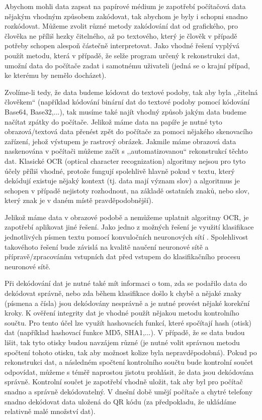 \documentclass[conference]{IEEEtran}
\begin{document}
Abychom mohli data zapsat na papírové médium je zapotřebí počítačová data nějakým vhodným způsobem zakódovat, tak abychom je byly i schopni snadno rozkódovat. Můžeme zvolit různé metody zakódování dat od grafického, pro člověka ne příliš hezky čitelného, až po textového, který je člověk v případě potřeby schopen alespoň částečně interpretovat. Jako vhodné řešení vyplývá použít metodu, která v případě, že selže program určený k rekonstrukci dat, umožní data do počítače zadat i samotnému uživateli (jedná se o krajní případ, ke kterému by nemělo docházet). 

Zvolíme-li tedy, že data budeme kódovat do textové podoby, tak aby byla ,,čitelná člověkem`` (například kódování binární dat do textové podoby pomocí kódování Base64, Base32,...), tak musíme také najít vhodný způsob jakým data budeme načítat zpátky do počítače. Jelikož máme data na papíře je nutné tyto obrazová/textová data přenést zpět do počítače za pomoci nějakého skenovacího zařízení, jehož výstupem je rastrový obrázek. Jakmile máme obrazová data naskenována v počítači můžeme začít s ,,automatizovanou`` rekonstrukcí těchto dat. Klasické OCR (optical character recognization) algoritmy nejsou pro tyto účely příliš vhodné, protože fungují spolehlivě hlavně pokud v textu, který dekódují existuje nějaký kontext (tj. data mají význam slov) a algoritmus je schopen v případě nejistoty rozhodnout, na základě ostatních znaků, nebo slov, který znak je v daném místě pravděpodobnější).

Jelikož máme data v obrazové podobě a nemůžeme uplatnit algoritmy OCR, je zapotřebí aplikovat jiné řešení. Jako jedno z možných řešení je využití klasifikace jednotlivých písmen textu pomocí konvuločních neuronových sítí \cite{NIPS2010_4136}. Spolehlivost takovéhoto řešení bude závislá na kvalitě naučení neuronové sítě a přípravě/zpracováním vstupních dat před vstupem do klasifikačního procesu neuronové sítě.

Při dekódování dat je nutné také mít informaci o tom, zda se podařilo data do dekódovat správně, nebo zda během klasifikace došlo k chybě a nějaké znaky (písmena a čísla) jsou dekódovány nesprávně a je nutné provést nějaké korekční kroky. K ověření integrity dat je vhodné použít nějakou metodu kontrolního součtu. Pro tento účel lze využít hashovacích funkcí, které spočítají hash (otisk) dat (například hashovací funkce MD5, SHA1,...). V případě, že se data budou lišit, tak tyto otisky budou navzájem různé (je nutné volit správnou metodu spočtení tohoto otisku, tak aby možnost kolize byla nepravděpodobná). Pokud po rekonstrukci dat, a následném spočtení kontrolního součtu bude kontrolní součet odpovídat, můžeme s téměř naprostou jistotu prohlásit, že data jsou dekódována správně. Kontrolní součet je zapotřebí vhodně uložit, tak aby byl pro počítač snadno a správně dekódovatelný. V dnešní době umějí počítače a chytré telefony snadno dekódovat data uložená do QR kódu (za předpokladu, že ukládáme relativně malé množství dat).
\end{document}
